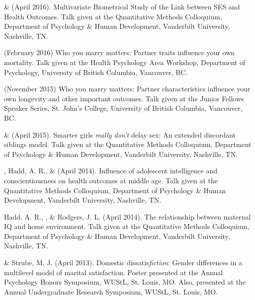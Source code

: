 \item\meb \& \Joe (April 2016). Multivariate Biometrical Study of the Link between SES and Health Outcomes. Talk given at the Quantitative Methods Colloquium, Department of Psychology \& Human Development, Vanderbilt University, Nashville, TN.
\item \meb (February 2016) Who you marry matters: Partner traits influence your own mortality. Talk given at the Health Psychology Area Workshop, Department of Psychology, University of British Columbia, Vancouver, BC.
\item \meb (November 2015) Who you marry matters: Partner characteristics influence your own longevity and other important outcomes. Talk given at the Junior Fellows Speaker Series, St. John's College, University of British Columbia, Vancouver, BC.
\item\meb \& \Joe (April 2015). Smarter girls \textit{really don't} delay sex: An extended discordant siblings model. Talk given at the Quantitative Methods Colloquium, Department of Psychology \& Human Development, Vanderbilt University, Nashville, TN.
\item\meb, Hadd, A. R., \& \Joe (April 2014). Influence of adolescent intelligence and conscientiousness on health outcomes at middle age. Talk given at the Quantitative Methods Colloquium, Department of Psychology \& Human Development, Vanderbilt University, Nashville, TN.
\item Hadd, A. R., \meb, \& Rodgers, J. L. (April 2014). The relationship between maternal IQ and home environment. Talk given at the Quantitative Methods Colloquium, Department of Psychology \& Human Development, Vanderbilt University, Nashville, TN.
\item\meb \& Strube, M. J. (April 2013). Domestic dissatis{\em fiction}: Gender differences in a multilevel model of marital satisfaction. Poster presented at the Annual Psychology Honors Symposium, WUStL, St. Louis, MO. Also, presented at the Annual Undergraduate Research Symposium, WUStL, St. Louis, MO.